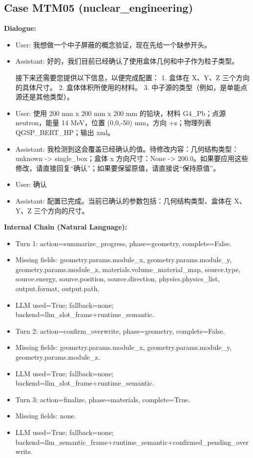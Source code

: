 \documentclass[11pt]{ctexart}
\begin{document}
\subsection{Case MTM05 (nuclear\_engineering)}
\textbf{Dialogue:}
\begin{itemize}
\item User: 我想做一个中子屏蔽的概念验证，现在先给一个缺参开头。
\item Assistant: 好的，我们目前已经确认了使用盒体几何和中子作为粒子类型。

接下来还需要您提供以下信息，以便完成配置：
1.  盒体在 X、Y、Z 三个方向的具体尺寸。
2.  盒体体积所使用的材料。
3.  中子源的类型（例如，是单能点源还是其他类型）。
\item User: 使用 200 mm x 200 mm x 200 mm 的铅块，材料 G4\_Pb；点源 neutron，能量 14 MeV，位置 (0,0,-50) mm，方向 +z；物理列表 QGSP\_BERT\_HP；输出 xml。
\item Assistant: 我检测到这会覆盖已经确认的值。待修改内容：几何结构类型：unknown -> single\_box；盒体 x 方向尺寸：None -> 200.0。如果要应用这些修改，请直接回复“确认”；如果要保留原值，请直接说“保持原值”。
\item User: 确认
\item Assistant: 配置已完成。当前已确认的参数包括：几何结构类型、盒体在 X、Y、Z 三个方向的尺寸。
\end{itemize}
\textbf{Internal Chain (Natural Language):}
\begin{itemize}
\item Turn 1: action=summarize\_progress, phase=geometry, complete=False.
\item Missing fields: geometry.params.module\_x, geometry.params.module\_y, geometry.params.module\_z, materials.volume\_material\_map, source.type, source.energy, source.position, source.direction, physics.physics\_list, output.format, output.path.
\item LLM used=True; fallback=none; backend=llm\_slot\_frame+runtime\_semantic.
\item Turn 2: action=confirm\_overwrite, phase=geometry, complete=False.
\item Missing fields: geometry.params.module\_x, geometry.params.module\_y, geometry.params.module\_z.
\item LLM used=True; fallback=none; backend=llm\_slot\_frame+runtime\_semantic.
\item Turn 3: action=finalize, phase=materials, complete=True.
\item Missing fields: none.
\item LLM used=True; fallback=none; backend=llm\_semantic\_frame+runtime\_semantic+confirmed\_pending\_overwrite.
\end{itemize}
\end{document}
